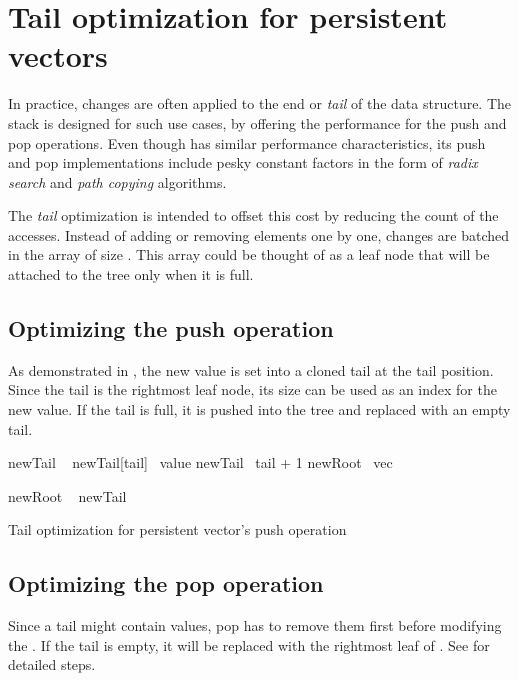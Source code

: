 \chapter{Tail optimization for persistent vectors}
\label{sec:tail-optimization}

In practice, changes are often applied to the end or \emph{tail} of the data structure. The stack is designed for such use cases, by offering the  performance for the push and pop operations. Even though \treerrb{} has similar performance characteristics, its push and pop implementations include pesky constant factors in the form of \emph{radix search} and \emph{path copying} algorithms.

The \emph{tail} optimization is intended to offset this cost by reducing the count of the \treerrb{} accesses. Instead of adding or removing elements one by one, changes are batched in the array of size \m{}. This array could be thought of as a leaf node that will be attached to the tree only when it is full.

\section{Optimizing the push operation}
As demonstrated in , the new value is set into a cloned tail at the tail position. Since the tail is the rightmost leaf node, its size can be used as an index for the new value. If the tail is full, it is pushed into the tree and replaced with an empty tail.

\begin{listing}[!ht]
    \begin{algorithmic}[1]
        \State newTail \la\ 
        \State newTail[tail] \la\ value
        \State newTail \la\ tail + 1
        \State newRoot \la\ vec

            \State newRoot \la\ 
            \State newTail \la\ 
        \EndIf

        \State \Return {}
        \EndFunction
    \end{algorithmic}

    \caption{Tail optimization for persistent vector's push operation}
    \label{lst:tail-push}
\end{listing}

\section{Optimizing the pop operation}
Since a tail might contain values, pop has to remove them first before modifying the \treerrb{}. If the tail is empty, it will be replaced with the rightmost leaf of \treerrb{}. See  for detailed steps.

